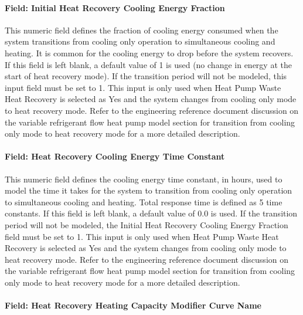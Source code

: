 \paragraph{Field: Initial Heat Recovery Cooling Energy Fraction}\label{field-initial-heat-recovery-cooling-energy-fraction}

This numeric field defines the fraction of cooling energy consumed when the system transitions from cooling only operation to simultaneous cooling and heating. It is common for the cooling energy to drop before the system recovers. If this field is left blank, a default value of 1 is used (no change in energy at the start of heat recovery mode). If the transition period will not be modeled, this input field must be set to 1. This input is only used when Heat Pump Waste Heat Recovery is selected as Yes and the system changes from cooling only mode to heat recovery mode. Refer to the engineering reference document discussion on the variable refrigerant flow heat pump model section for transition from cooling only mode to heat recovery mode for a more detailed description.

\paragraph{Field: Heat Recovery Cooling Energy Time Constant}\label{field-heat-recovery-cooling-energy-time-constant}

This numeric field defines the cooling energy time constant, in hours, used to model the time it takes for the system to transition from cooling only operation to simultaneous cooling and heating. Total response time is defined as 5 time constants. If this field is left blank, a default value of 0.0 is used. If the transition period will not be modeled, the Initial Heat Recovery Cooling Energy Fraction field must be set to 1. This input is only used when Heat Pump Waste Heat Recovery is selected as Yes and the system changes from cooling only mode to heat recovery mode. Refer to the engineering reference document discussion on the variable refrigerant flow heat pump model section for transition from cooling only mode to heat recovery mode for a more detailed description.

\paragraph{Field: Heat Recovery Heating Capacity Modifier Curve Name}\label{field-heat-recovery-heating-capacity-modifier-curve-name}

